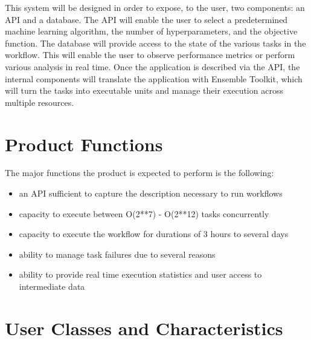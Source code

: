 \documentclass{scrreprt}
\begin{document}
This system will be designed in order to expose, to the user, two components: an API and a database. The API will enable the user to select a predetermined machine learning algorithm, the number of hyperparameters, and the objective function. The database will provide access to the state of the various tasks in the workflow. This will enable the user to observe performance metrics or perform various analysis in real time. 
Once the application is described via the API, the internal components will translate the application with Ensemble Toolkit, which will turn the tasks into executable units and manage their execution across multiple resources. 

\section{Product Functions}

The major functions the product is expected to perform is the following:

\begin{itemize}[noitemsep]
\item an API sufficient to capture the description necessary to run workflows
\item capacity to execute between O(2**7) - O(2**12) tasks concurrently
\item capacity to execute the workflow for durations of 3 hours to several days
\item ability to manage task failures due to several reasons
\item ability to provide real time execution statistics and user access to intermediate data
\end{itemize}

\section{User Classes and Characteristics}
\end{document}
